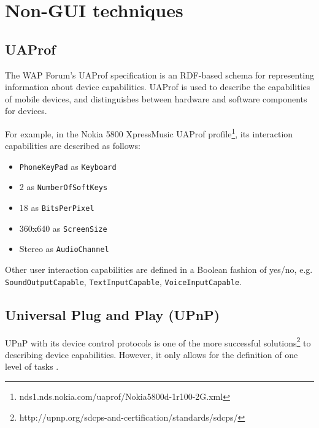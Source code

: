 \section{Non-GUI techniques}

\subsection{UAProf}

The WAP Forum's \ac{UAProf} specification is an \ac{RDF}-based schema for representing information about device capabilities. UAProf is used to describe the capabilities of mobile devices, and distinguishes between hardware and software components for devices.


For example, in the Nokia 5800 XpressMusic UAProf profile\footnote{nds1.nds.nokia.com/uaprof/Nokia5800d-1r100-2G.xml
}, its interaction capabilities are described as follows:

\begin{itemize}
	\item \texttt{PhoneKeyPad} as \texttt{Keyboard}
	\item 2 as \texttt{NumberOfSoftKeys}
	\item 18 as \texttt{BitsPerPixel}
	\item 360x640 as \texttt{ScreenSize}
	\item Stereo as \texttt{AudioChannel}
\end{itemize}

Other user interaction capabilities are defined in a Boolean fashion of yes/no, e.g. \texttt{SoundOutputCapable}, \texttt{TextInputCapable}, \texttt{Voice\-Input\-Capable}.

\subsection{Universal Plug and Play (UPnP)}
\label{UPnP}

\ac{UPnP} with its device control protocols is one of the more successful solutions\footnote{http://upnp.org/sdcps-and-certification/standards/sdcps/} to describing device capabilities. However, it only allows for the definition of one level of tasks \cite{Niezen2010}.

